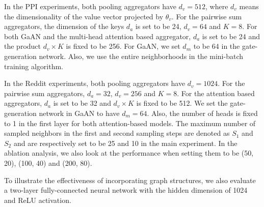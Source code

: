\documentclass{article}
\begin{document}
	In the PPI experiments, both pooling aggregators have $d_v = 512$, where $d_v$ means the dimensionality of the value vector projected by $\theta_v$. For the pairwise sum aggregators, the dimension of the keys $d_a$ is set to be 24, $d_v=64$ and $K=8$.
	For both GaAN and the multi-head attention based aggregator, $d_a$ is set to be 24 and the product $d_v \times K$ is fixed to be 256. For GaAN, we set $d_m$ to be 64 in the gate-generation network. Also, we use the entire neighborhoods in the mini-batch training algorithm.
	
	In the Reddit experiments, both pooling aggregators have $d_v = 1024$. For the pairwise sum aggregators, $d_a=32$, $d_v=256$ and $K=8$. For the attention based aggregators, $d_a$ is set to be 32 and $d_v \times K$ is fixed to be 512. We set the gate-generation network in GaAN to have $d_m = 64$. Also, the number of heads is fixed to 1 in the first layer for both attention-based models. The maximum number of sampled neighbors in the first and second sampling steps are denoted as $S_1$ and $S_2$ and are respectively set to be 25 and 10 in the main experiment. In the ablation analysis, we also look at the performance when setting them to be (50, 20), (100, 40) and (200, 80).
	
	To illustrate the effectiveness of incorporating graph structures, we also evaluate a two-layer fully-connected neural network with the hidden dimension of 1024 and ReLU activation.
\end{document}
